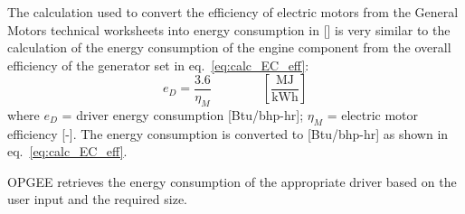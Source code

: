 \documentclass[11pt]{report}
\newcommand{\eqnunitfrac}[2]{\quad\quad \scriptstyle{\left[\frac{\text{#1}}{\text{#2}}\right]}}
\begin{document}
The calculation used to convert the efficiency of electric motors from the General Motors technical worksheets into energy consumption in [] is very similar to the calculation of the energy consumption of the engine component from the overall efficiency of the generator set in eq.\ \eqref{eq:calc_EC_eff}:
\begin{equation} \label{eq:electric_motor_EC}
e_{D} =\frac{3.6}{\eta_{M}} \quad\quad\eqnunitfrac{MJ}{kWh}
\end{equation}
where $e_{D}$ = driver energy consumption [Btu/bhp-hr]; $\eta_{M}$ = electric motor efficiency [-]. The energy consumption is converted to [Btu/bhp-hr] as shown in eq.\ \eqref{eq:calc_EC_eff}.

OPGEE retrieves the energy consumption of the appropriate driver based on the user input and the required size. 
\end{document}
